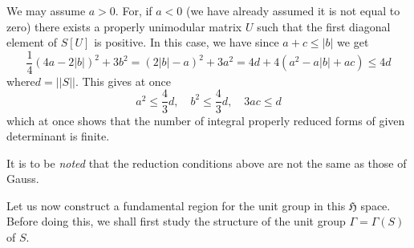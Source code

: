 We may assume $a>0$. For, if $a<0$ (we have already assumed it is not
equal to zero) there exists a properly unimodular matrix $U$ such that
the first diagonal element of $S[U]$ is positive. In this case, we
have since $a+c\leq |b|$ we get
$$
\frac{1}{4}(4a-2|b|)^{2}+3b^{2}=(2|b|-a)^{2}+3a^{2}=4d+4(a^{2}-a|b|+ac)\leq
4d
$$
where\pageoriginale $d=||S||$. This gives at once
$$
a^{2}\leq \frac{4}{3}d,\quad b^{2}\leq \frac{4}{3}d,\quad 3ac\leq d
$$
which at once shows that the number of integral properly reduced forms
of given determinant is finite.

It is to be {\em noted} that the reduction conditions above are not
the same as those of Gauss.

Let us now construct a fundamental region for the unit group in this
$\mathfrak{H}$ space. Before doing this, we shall first study the
structure of the unit group $\Gamma=\Gamma(S)$ of $S$.

